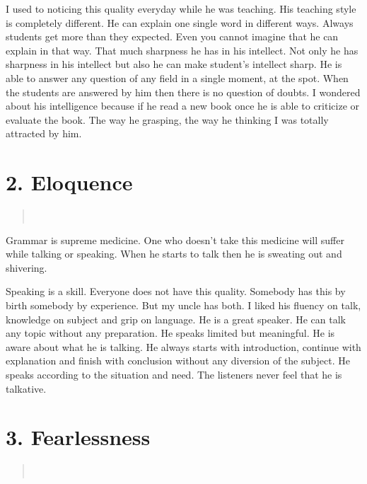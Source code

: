 I used to noticing this quality everyday while he was teaching. His teaching style is completely different. He can explain one single word in different ways. Always students get more than they expected. Even you cannot imagine that he can explain in that way. That much sharpness he has in his intellect. Not only he has sharpness in his intellect but also he can make student’s intellect sharp.  He is able to answer any question of any field in a single moment, at the spot. When the students are answered by him then there is no question of doubts. I wondered about his intelligence because if he read a new book once he is able to criticize or evaluate the book. The way he grasping, the way he thinking I was totally attracted by him.

\section*{2. Eloquence }

\begin{verse}
\\
\end{verse}
Grammar is supreme medicine. One who doesn’t take this medicine will suffer while talking or speaking. When he starts to talk then he is sweating out and shivering.

Speaking is a skill. Everyone does not have this quality. Somebody has this by birth somebody by experience. But my uncle has both. I liked his fluency on talk, knowledge on subject and grip on language. He is a great speaker. He can talk any topic without any preparation. He speaks limited but meaningful. He is aware about what he is talking. He always starts with introduction, continue with explanation and finish with conclusion without any diversion of the subject. He speaks according to the situation and need. The listeners never feel that he is talkative.

\section*{3. Fearlessness }

\begin{verse}
\\
\end{verse}
\vskip -6pt

